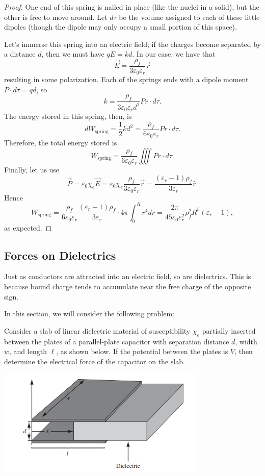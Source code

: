 \begin{proof}
One end of this spring is nailed in place (like the nuclei in a solid), but the other is free to move around. Let $d\tau$ be the volume assigned to each of these little dipoles (though the dipole may only occupy a small portion of this space).

Let's immerse this spring into an electric field; if the charges become separated by a distance $d$, then we must have $qE=kd$. In our case, we have that
\[\vec{E}=\frac{\rho_f}{3\varepsilon_0\varepsilon_r}\vec{r}\]
resulting in some polarization. Each of the springs ends with a dipole moment $P\cdot d\tau=qd$, so
\[k=\frac{\rho_f}{3\varepsilon_0\varepsilon_rd^2}Pr\cdot d\tau.\]
The energy stored in this spring, then, is
\[dW_{\text{spring}}=\frac{1}{2}kd^2=\frac{\rho_f}{6\varepsilon_0\varepsilon_r}Pr\cdot d\tau.\]
Therefore, the total energy stored is
\[W_{\text{spring}}=\frac{\rho_f}{6\varepsilon_0\varepsilon_r}\iiint Pr\cdot d\tau.\]
Finally, let us use
\[\vec{P}=\varepsilon_0\chi_e\vec{E}=\varepsilon_0\chi_e\frac{\rho_f}{3\varepsilon_0\varepsilon_r}\vec{r}=\frac{(\varepsilon_r-1)\rho_f}{3\varepsilon_r}\hat{r}.\]
Hence 
\[W_{\text{spring}}=\frac{\rho_f}{6\varepsilon_0\varepsilon_r}\frac{(\varepsilon_r-1)\rho_f}{3\varepsilon_r}\cdot 4\pi\int_0^R r^4dr=\frac{2\pi}{45\varepsilon_0\varepsilon_r^2}\rho_f^2R^5(\varepsilon_r-1),\]
as expected.
\end{proof}

\subsection{Forces on Dielectrics}

Just as conductors are attracted into an electric field, so are dielectrics. This is because bound charge tends to accumulate near the free charge of the opposite sign.

In this section, we will consider the following problem:

\begin{example}
Consider a slab of linear dielectric material of susceptibility $\chi_e$ partially inserted between the plates of a parallel-plate capacitor with separation distance $d$, width $w$, and length $\ell$, as shown below. If the potential between the plates is $V$, then determine the electrical force of the capacitor on the slab.
\end{example}

\begin{center}
    \includegraphics[width=10cm]{Electrodynamics/images/fig4.30.PNG}
\end{center}


